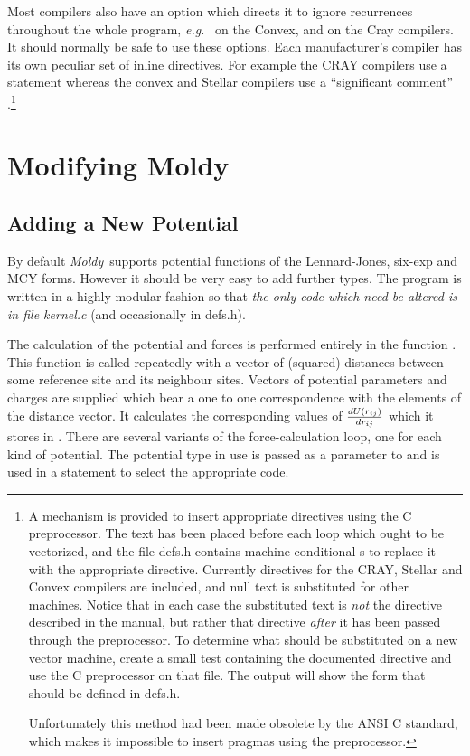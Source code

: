 \documentclass[a4paper,twoside]{report}
\newcommand{\Fname}[1]{{\upshape\mdseries\sffamily#1}}
\newcommand{\moldy}{\emph{Moldy}}
\newcommand{\eg}{\emph{e.g.}}
\begin{document}
Most compilers also have an option which directs it to ignore
recurrences throughout the whole program, \eg\  on the
Convex,  and  on the Cray compilers.  It
should normally be safe to use these options. Each manufacturer's
compiler has its own peculiar set of inline directives.  For example
the CRAY compilers use a ~ statement
whereas the convex and Stellar compilers use a ``significant comment''
.\footnote{A mechanism is
  provided to insert appropriate directives using the C preprocessor.
  The text  has been placed before each loop which
  ought to be vectorized, and the file \Fname{defs.h} contains
  machine-conditional s to replace it with the
  appropriate directive.  Currently directives for the CRAY, Stellar
  and Convex compilers are included, and null text is substituted for
  other machines.  Notice that in each case the substituted text is
  \emph{not} the directive described in the manual, but rather that
  directive \emph{after} it has been passed through the preprocessor.
  To determine what should be substituted on a new vector machine,
  create a small test containing the documented directive and use the
  C preprocessor on that file. The output will show the form that
  should be defined in \Fname{defs.h}.
  
  Unfortunately this method had been made obsolete by the ANSI C standard,
  which makes it impossible to insert pragmas using the
  preprocessor. } 

\section{Modifying Moldy}%
\subsection{Adding a New Potential}
\label{sec:newpot}
By default \moldy\ supports potential functions of the Lennard-Jones,
six-exp and MCY forms.  However it should be very easy to add further
types. The program is written in a highly modular fashion so that
\emph{the only code which need be altered is in file \Fname{kernel.c}}
(and occasionally in \Fname{defs.h}).

The calculation of the potential and forces is performed entirely in
the function .  This function is called repeatedly with
a vector of (squared) distances between some reference site and its
neighbour sites.  Vectors of potential parameters and charges are
supplied which bear a one to one correspondence with the elements of
the distance vector.  It calculates the corresponding values of
${dU(r_{ij})} \over {dr_{ij}}$ which it stores in .
There are several variants of the force-calculation loop, one for each
kind of potential.  The potential type in use is passed as a parameter
to  and is used in a  statement to select
the appropriate code. 
\end{document}
